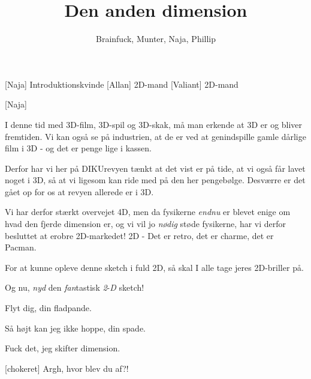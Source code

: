 \documentclass[a4paper,11pt]{article}
\title{Den anden dimension}
\author{Brainfuck, Munter, Naja, Phillip}
\begin{document}
 \maketitle
\begin{roles}
[Naja] Introduktionskvinde
[Allan] 2D-mand
[Valiant] 2D-mand
\end{roles}

\begin{props}
[Naja]
\end{props}


\begin{sketch}


  I denne tid med 3D-film, 3D-spil og 3D-skak, må man erkende at 3D er og bliver fremtiden.  Vi kan også se på industrien, at de er ved at genindspille gamle dårlige film i 3D  - og det er penge lige i kassen.

  Derfor har vi her på DIKUrevyen tænkt at det vist er på tide, at vi også får lavet noget i 3D, så at vi ligesom kan ride med på den her pengebølge.  Desværre er det gået op for os at revyen allerede er i 3D.

  Vi har derfor stærkt overvejet 4D, men da fysikerne \emph{endnu}
er blevet enige om hvad den fjerde dimension er, og vi vil jo \emph{nødig}
støde fysikerne, har vi derfor besluttet at erobre 2D-markedet! 2D - Det er retro, det er charme, det er Pacman.

  For at kunne opleve denne sketch i fuld 2D, så skal I alle
tage jeres 2D-briller på. 

  Og nu, \emph{nyd} den \emph{fan}tastisk \emph{2}-\emph{D} sketch!


  Flyt dig, din fladpande.

  Så højt kan jeg ikke hoppe, din spade.

  Fuck det, jeg skifter dimension.


[chokeret]  Argh, hvor blev du af?!


\end{sketch}
\end{document}
